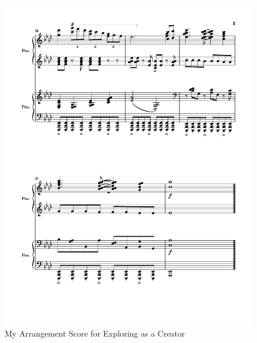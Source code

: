 \documentclass[12pt]{article}
\begin{document}
\begin{figure}[H]
\begin{tabular}{cc}
\end{tabular}
\includegraphics[width=0.4\linewidth, trim=30 100 30 20, clip]{octopathscore/octopathscore1024_5.png}
\caption{My Arrangement Score for Exploring as a Creator}
\end{figure}
\end{document}

